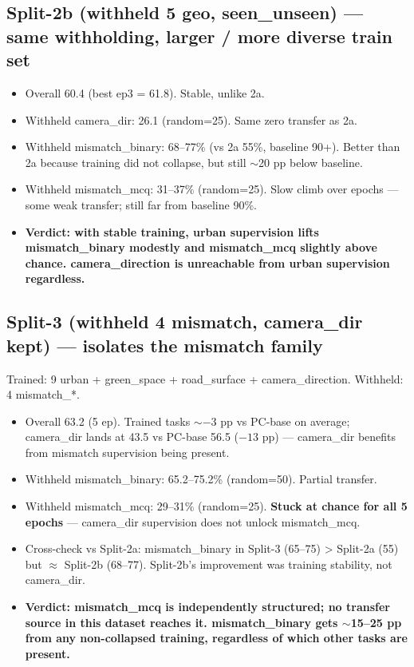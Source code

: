 \documentclass[11pt]{article}
\begin{document}
\subsection*{Split-2b (withheld 5 geo, seen\_unseen) --- same withholding, larger / more diverse train set}

\begin{itemize}\itemsep1pt
\item Overall 60.4 (best ep3 = 61.8). Stable, unlike 2a.
\item Withheld camera\_dir: 26.1 (random=25). Same zero transfer as 2a.
\item Withheld mismatch\_binary: 68--77\% (vs 2a 55\%, baseline 90+). Better than 2a because training did not collapse, but still $\sim$20 pp below baseline.
\item Withheld mismatch\_mcq: 31--37\% (random=25). Slow climb over epochs --- some weak transfer; still far from baseline 90\%.
\item \textbf{Verdict: with stable training, urban supervision lifts mismatch\_binary modestly and mismatch\_mcq slightly above chance. camera\_direction is unreachable from urban supervision regardless.}
\end{itemize}

\subsection*{Split-3 (withheld 4 mismatch, camera\_dir kept) --- isolates the mismatch family}

Trained: 9 urban + green\_space + road\_surface + camera\_direction. Withheld: 4 mismatch\_*.

\begin{itemize}\itemsep1pt
\item Overall 63.2 (5 ep). Trained tasks $\sim$$-3$ pp vs PC-base on average; camera\_dir lands at 43.5 vs PC-base 56.5 ($-13$ pp) --- camera\_dir benefits from mismatch supervision being present.
\item Withheld mismatch\_binary: 65.2--75.2\% (random=50). Partial transfer.
\item Withheld mismatch\_mcq: 29--31\% (random=25). \textbf{Stuck at chance for all 5 epochs} --- camera\_dir supervision does not unlock mismatch\_mcq.
\item Cross-check vs Split-2a: mismatch\_binary in Split-3 (65--75) > Split-2a (55) but $\approx$ Split-2b (68--77). Split-2b's improvement was training stability, not camera\_dir.
\item \textbf{Verdict: mismatch\_mcq is independently structured; no transfer source in this dataset reaches it. mismatch\_binary gets $\sim$15--25 pp from any non-collapsed training, regardless of which other tasks are present.}
\end{itemize}
\end{document}
